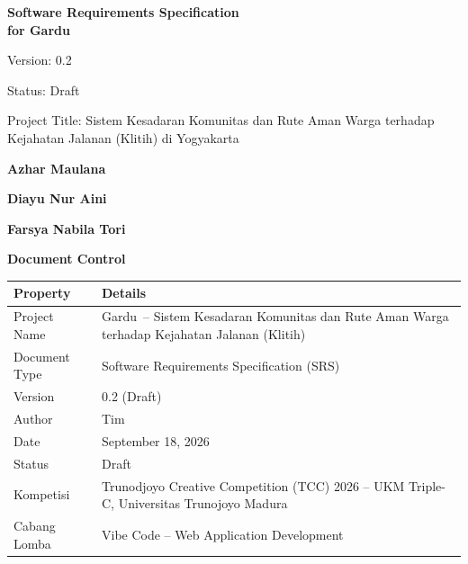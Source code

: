 \documentclass[11pt,a4paper]{article}
\newcommand{\appname}{Gardu}
\begin{document}

\begin{titlepage}
\thispagestyle{empty}
\centering
\vspace*{1.0cm}

{\Huge\bfseries Software Requirements Specification\\[0.25cm] for \appname\par}

\vspace{0.45cm}
{\large Version: 0.2 \par}
\vspace{0.15cm}
{Status: Draft \par}
\vspace{0.15cm}
{\large Project Title: Sistem Kesadaran Komunitas dan Rute Aman Warga terhadap Kejahatan Jalanan (Klitih) di Yogyakarta\par}

\vspace{0.85cm}
{\large\bfseries Azhar Maulana}\par
{\large\bfseries Diayu Nur Aini}\par
{\large\bfseries Farsya Nabila Tori}\par

\vspace{4cm}

{\Large\bfseries Document Control\par}
\vspace{0.35cm}

\begin{tabularx}{0.86\textwidth}{|L{3.4cm}|Y|}
\hline
{}\textbf{Property} & \textbf{Details} \\ \hline
Project Name & \appname\ -- Sistem Kesadaran Komunitas dan Rute Aman Warga terhadap Kejahatan Jalanan (Klitih) \\ \hline
Document Type & Software Requirements Specification (SRS) \\ \hline
Version & 0.2 (Draft) \\ \hline
Author & Tim \\ \hline
Date & September 18, 2026 \\ \hline
Status & Draft \\ \hline
Kompetisi & Trunodjoyo Creative Competition (TCC) 2026 -- UKM Triple-C, Universitas Trunojoyo Madura \\ \hline
Cabang Lomba & Vibe Code -- Web Application Development \\ \hline
\end{tabularx}

\end{titlepage}
\end{document}
